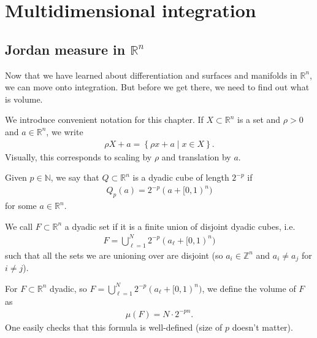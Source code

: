 \chapter{Multidimensional integration}

\section{Jordan measure in $\mathbb{R}^{n}$}

Now that we have learned about differentiation and surfaces and manifolds in $\mathbb{R}^{n}$, we can move onto integration. But before we get there, we need to find out what is volume.

We introduce convenient notation for this chapter. If $X \subset \mathbb{R}^{n}$ is a set and $\rho > 0$ and $a \in \mathbb{R}^{n}$, we write
\begin{align*}
    \rho X + a = \left\{ \rho x + a \mid x \in X \right\}.
\end{align*}
Visually, this corresponds to scaling by $\rho$ and translation by $a$.

\begin{definition}\label{def:daydic-cube}
    Given $p \in \mathbb{N}$, we say that $Q \subset \mathbb{R}^{n}$ is a dyadic cube of length $2^{-p}$ if
    \begin{align*}
        Q_{p}(a) = 2^{-p}(a + [0,1)^{n})
    \end{align*}
    for some $a \in \mathbb{R}^{n}$. 
\end{definition}

\begin{definition}\label{def:dyadic-subset}
    We call $F \subset \mathbb{R}^{n}$ a dyadic set if it is a finite union of disjoint dyadic cubes, i.e.
    \begin{align*}
        F = \bigcup_{\ell=1}^{N} 2^{-p}(a_{\ell} + [0,1)^{n})
    \end{align*}
    such that all the sets we are unioning over are disjoint (so $a_{i} \in \mathbb{Z}^{n}$ and $a_{i} \neq a_{j}$ for $i \neq j$).
\end{definition}

\begin{definition}\label{def:minecraft}
    For $F \subset \mathbb{R}^{n}$ dyadic, so $F = \bigcup_{\ell=1}^{N} 2^{-p}(a_{\ell} + [0,1)^{n})$,
    we define the volume of $F$ as 
    \begin{align*}
        \mu(F) = N \cdot 2^{-pn}.
    \end{align*}
    One easily checks that this formula is well-defined (size of $p$ doesn't matter).
\end{definition}

